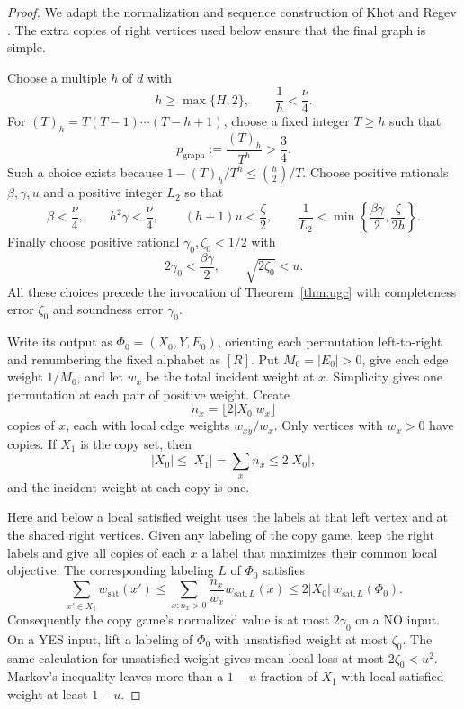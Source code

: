 \begin{proof}
We adapt the normalization and sequence construction of Khot and Regev
\cite[Lemmas~3.3, 3.4, and~3.6]{KhotRegev2008}.  The extra copies of
right vertices used below ensure that the final graph is simple.

Choose a multiple \(h\) of \(d\) with
\[
 h\ge\max\{H,2\},\qquad \frac1h<\frac{\nu}{4}.
\]
For \((T)_h=T(T-1)\cdots(T-h+1)\), choose a fixed integer \(T\ge h\)
such that
\[
 p_{\mathrm{graph}}:=\frac{(T)_h}{T^h}>\frac34.
\]
Such a choice exists because \(1-(T)_h/T^h\le\binom h2/T\).
Choose positive rationals \(\beta,\gamma,u\) and a positive integer
\(L_2\) so that
\[
 \beta<\frac{\nu}{4},\qquad
 h^2\gamma<\frac{\nu}{4},\qquad
 (h+1)u<\frac{\zeta}{2},\qquad
 \frac1{L_2}<\min\left\{\frac{\beta\gamma}{2},
                            \frac{\zeta}{2h}\right\}.
\]
Finally choose positive rational \(\gamma_0,\zeta_0<1/2\) with
\[
 2\gamma_0<\frac{\beta\gamma}{2},
 \qquad \sqrt{2\zeta_0}<u.
\]
All these choices precede the invocation of
Theorem~\ref{thm:ugc} with completeness error \(\zeta_0\) and soundness
error \(\gamma_0\).

Write its output as \(\Phi_0=(X_0,Y,E_0)\), orienting each permutation
left-to-right and renumbering the fixed alphabet as \([R]\).
Put \(M_0=|E_0|>0\), give each edge weight \(1/M_0\), and let \(w_x\)
be the total incident weight at \(x\).  Simplicity gives one permutation
at each pair of positive weight.  Create
\[
 n_x=\lfloor 2|X_0|w_x\rfloor
\]
copies of \(x\), each with local edge weights \(w_{xy}/w_x\).
Only vertices with \(w_x>0\) have copies.  If \(X_1\) is the copy set,
then
\[
 |X_0|\le |X_1|=\sum_x n_x\le2|X_0|,
\]
and the incident weight at each copy is one.

Here and below a local satisfied weight uses the labels at that left
vertex and at the shared right vertices.  Given any labeling of the
copy game, keep the right labels and give all copies of each \(x\) a
label that maximizes their common local objective.  The corresponding
labeling \(L\) of \(\Phi_0\) satisfies
\[
 \sum_{x'\in X_1} w_{\mathrm{sat}}(x')
 \le
 \sum_{x:n_x>0}\frac{n_x}{w_x}w_{\mathrm{sat},L}(x)
 \le 2|X_0|\,w_{\mathrm{sat},L}(\Phi_0).
\]
Consequently the copy game's normalized value is at most
\(2\gamma_0\) on a NO input.  On a YES input, lift a labeling of
\(\Phi_0\) with unsatisfied weight at most \(\zeta_0\).  The same
calculation for unsatisfied weight gives mean local loss at most
\(2\zeta_0<u^2\).  Markov's inequality leaves more than a \(1-u\)
fraction of \(X_1\) with local satisfied weight at least \(1-u\).


\end{proof}
